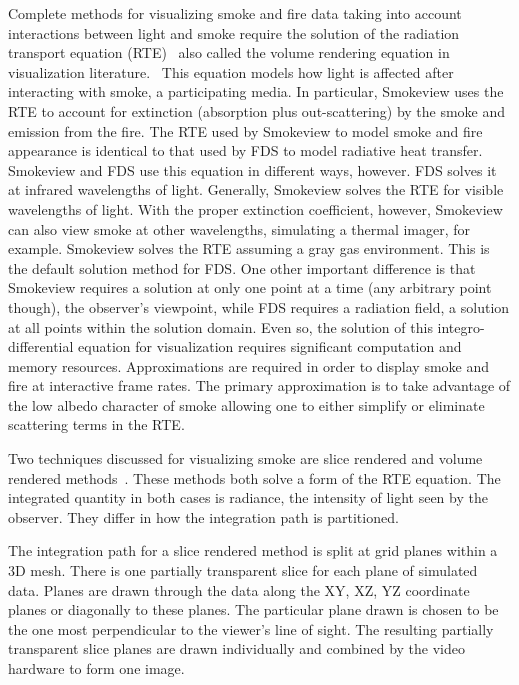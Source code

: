 Complete methods for visualizing smoke and fire data taking into account interactions between light and smoke require the solution of the radiation transport equation (RTE)~\cite{Siegel:2001} also called the volume rendering equation in visualization literature.~\cite{levoy:1988} This equation models how light is affected after interacting with smoke, a participating media. In particular, Smokeview uses the RTE to account for extinction (absorption plus out-scattering) by the smoke and emission from the fire.  The RTE used by Smokeview to model smoke and fire appearance is identical to that used by FDS to model radiative heat transfer.  Smokeview and FDS use this equation in different ways, however.  FDS solves it at infrared wavelengths of light.  Generally, Smokeview solves the RTE for visible wavelengths of light.  With the proper extinction coefficient, however, Smokeview can also view smoke at other wavelengths, simulating a thermal imager, for example. Smokeview solves the RTE assuming a gray gas environment.  This is the default solution method for FDS.  One other important difference is that Smokeview requires a solution at only one point at a time (any arbitrary point though), the observer's viewpoint, while FDS requires a radiation field, a solution at all points within the solution domain.  Even so, the solution of this integro-differential equation for visualization requires significant computation and memory  resources.  Approximations are required in order to display smoke and fire at interactive frame rates.  The primary approximation is to take advantage of the low albedo character of smoke allowing one to either simplify or eliminate scattering terms in the RTE.

Two techniques discussed for visualizing smoke are slice rendered and volume rendered methods~\cite{levoy:1988,Engel:2006}.    These methods both solve a form of the RTE equation.  The integrated quantity in both cases is radiance, the intensity of light seen by the observer.  They differ in how the integration path is partitioned.

The integration path for a slice rendered method is split at grid planes within a 3D mesh. There is one partially transparent slice for each plane of simulated data. Planes are drawn through the data along the XY, XZ, YZ coordinate planes or diagonally to these  planes.   The particular plane drawn is chosen to be the one most perpendicular to the viewer's line of sight.  The resulting partially transparent slice planes are drawn individually and combined by the video hardware to form one image.

